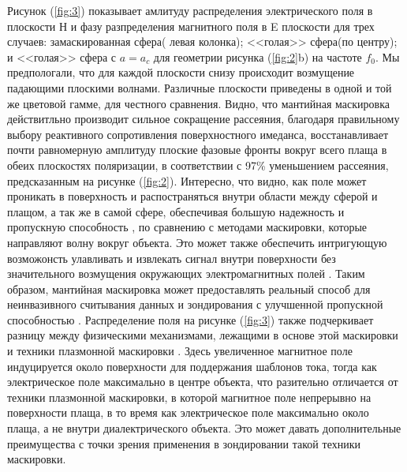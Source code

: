 \documentclass[12pt,a4paper]{article}
\begin{document}
Рисунок (\ref{fig:3}) показывает амлитуду распределения электрического поля в плоскости Н и
фазу разпределения магнитного поля в E плоскости для трех случаев: замаскированная сфера(
левая колонка); <<голая>> сфера(по центру); и <<голая>> сфера с $a=a_c$ для геометрии
рисунка (\ref{fig:2}b) на частоте $f_0$. Мы предпологали, что для каждой плоскости снизу
происходит возмущение падающими плоскими волнами. Различные плоскости приведены в одной и той
же цветовой гамме, для честного сравнения. Видно, что мантийная маскировка действитльно производит
сильное сокращение рассеяния, благодаря правильному выбору реактивного сопротивления 
поверхностного имеданса, восстанавливает почти равномерную амплитуду плоские фазовые фронты
вокруг всего плаща в обеих плоскостях поляризации, в соответствии с 97\% уменьшением
рассеяния, предсказанным на рисунке (\ref{fig:2}). Интересно, что видно, как поле может
проникать в поверхность и распостраняться внутри области между сферой и плащом, а так же в 
самой сфере, обеспечивая большую надежность и пропускную способность \cite{12}, по сравнению
с методами маскировки, которые направляют волну вокруг объекта. Это может также обеспечить
интригующую возможонсть улавливать и извлекать сигнал внутри поверхности без значительного
возмущения окружающих электромагнитных полей \cite{16}. Таким образом, мантийная маскировка может
предоставлять реальный способ для неинвазивного считывания данных и зондирования с улучшенной
пропускной способностью \cite{17}. Распределение поля на рисунке (\ref{fig:3}) также 
подчеркивает разницу между физическими механизмами, лежащими в основе этой маскировки и
техники плазмонной маскировки \cite{8}. Здесь увеличенное магнитное поле индуцируется 
около поверхности для поддержания шаблонов тока, тогда как электрическое поле максимально в
центре объекта, что разительно отличается от техники плазмонной маскировки, в которой 
магнитное поле непрерывно на поверхности плаща, в то время как электрическое поле максимально
около плаща, а не внутри диалектрического объекта. Это может давать дополнительные 
преимущества с точки зрения применения в зондировании такой техники маскировки.
\end{document}
